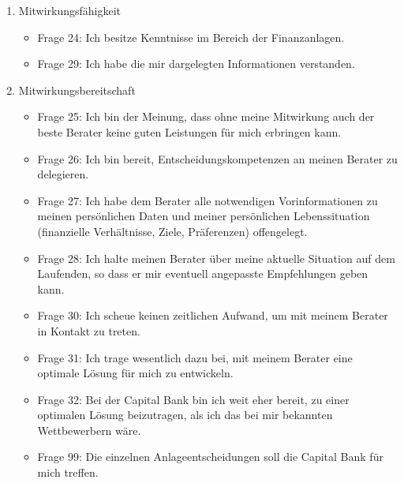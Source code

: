 \documentclass{article}\usepackage[]{graphicx}\usepackage[]{color}
\begin{document}
\begin{enumerate}

  \item Mitwirkungsfähigkeit
		\begin{itemize}
			\item Frage 24:
			Ich besitze Kenntnisse im Bereich der Finanzanlagen.
			\item Frage 29:
			Ich habe die mir dargelegten Informationen verstanden.
		\end{itemize}
		
		
	\item Mitwirkungsbereitschaft
		\begin{itemize}
			\item Frage 25:
			Ich bin der Meinung, dass ohne meine Mitwirkung auch der beste Berater keine guten Leistungen für mich erbringen kann.
			\item Frage 26:
			Ich bin bereit, Entscheidungskompetenzen an meinen Berater zu delegieren.
			\item Frage 27:
			Ich habe dem Berater alle notwendigen Vorinformationen zu meinen persönlichen Daten und meiner persönlichen Lebenssituation (finanzielle Verhältnisse, Ziele, Präferenzen) offengelegt.
			\item Frage 28:
			Ich halte meinen Berater über meine aktuelle Situation auf dem Laufenden, so dass er mir eventuell angepasste Empfehlungen geben kann.
			\item Frage 30:
			Ich scheue keinen zeitlichen Aufwand, um mit meinem Berater in Kontakt zu treten.
			\item Frage 31:
			Ich trage wesentlich dazu bei, mit meinem Berater eine optimale Lösung für mich zu entwickeln.
			\item Frage 32:
			Bei der Capital Bank bin ich weit eher bereit, zu einer optimalen Lösung beizutragen, als ich das bei mir bekannten Wettbewerbern wäre.
			\item Frage 99:
			Die einzelnen Anlageentscheidungen soll die Capital Bank für mich treffen.
		\end{itemize}
		

\end{enumerate}
\end{document}
